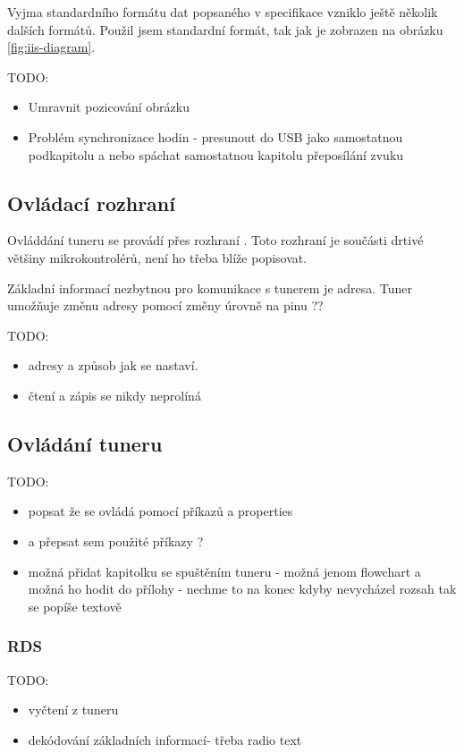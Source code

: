 
Vyjma standardního formátu dat popsaného v \iis specifikace \cite{iis} vzniklo ještě několik dalších formátů. Použil jsem standardní formát, tak jak je zobrazen na obrázku \ref{fig:iis-diagram}.

TODO:
\begin{itemize}
\item Umravnit pozicování obrázku
\item Problém synchronizace hodin - presunout do USB jako samostatnou podkapitolu a nebo spáchat samostatnou kapitolu přeposílání zvuku
\end{itemize}


\subsection{Ovládací rozhraní \iic}
Ovláddání tuneru se provádí přes rozhraní \iic. Toto rozhraní je součásti drtivé většiny mikrokontrolérů, není ho třeba blíže popisovat.

Základní informací nezbytnou pro komunikace s tunerem je \iic adresa. Tuner umožňuje změnu adresy pomocí změny úrovně na pinu ??


TODO:
\begin{itemize}
\item adresy a způsob jak se nastaví.
\item čtení a zápis se nikdy neprolíná
\end{itemize}

	
	
\subsection{Ovládání tuneru}
TODO:
\begin{itemize}
\item popsat že se ovládá pomocí příkazů a properties
\item a přepsat sem použité příkazy ?
\item možná přidat kapitolku se spuštěním tuneru - možná jenom flowchart a možná ho hodit do přílohy - nechme to na konec kdyby nevycházel rozsah tak se popíše textově
\end{itemize}


\subsubsection{RDS}
TODO:
\begin{itemize}
\item vyčtení z tuneru
\item dekódování základních informací- třeba radio text
\end{itemize}